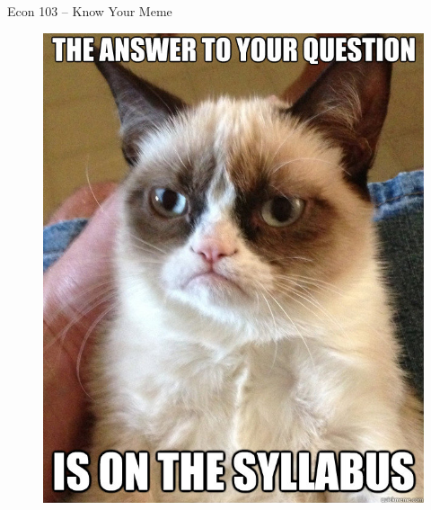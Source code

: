 \documentclass[handout]{beamer}
\date{Lecture \# 1}
\begin{document}
 



\begin{frame}[plain]
	\titlepage 
	

\end{frame} 


\begin{frame}
	
	\begin{center}
		\Huge Econ 103 -- Know Your Meme
	\end{center}
\end{frame}
\begin{frame}

\begin{figure}
\includegraphics[scale=0.33]{./images/SyllabusMeme.jpg}
\end{figure}


\end{frame}
\end{document}
